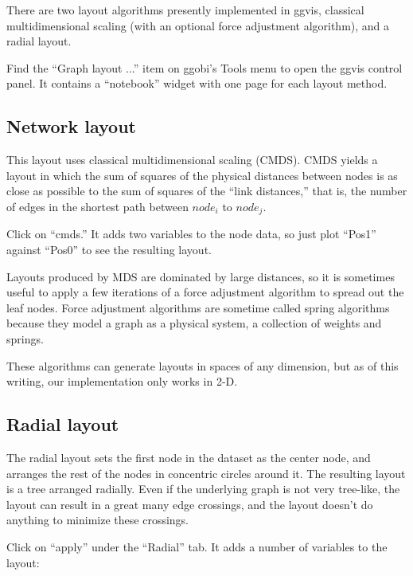 \documentclass[11pt]{article}
\begin{document}
There are two layout algorithms presently implemented in ggvis,
classical multidimensional scaling (with an optional force
adjustment algorithm), and a radial layout.

Find the ``Graph layout ...'' item on ggobi's Tools menu
to open the ggvis control panel.  It contains a ``notebook''
widget with one page for each layout method.

\subsection {Network layout}

This layout uses classical multidimensional scaling (CMDS).  CMDS yields a
layout in which the sum of squares of the physical distances between nodes
is as close as possible to the sum of squares of the ``link distances,''
that is, the number of edges in the shortest path between $node_i$
to $node_j$.

Click on ``cmds.''  It adds two variables to the node data, so 
just plot ``Pos1'' against ``Pos0'' to see the resulting layout.

Layouts produced by MDS are dominated by large distances, so it
is sometimes useful to apply a few iterations of a force adjustment
algorithm to spread out the leaf nodes.  Force adjustment algorithms
are sometime called spring algorithms because they model a graph as
a physical system, a collection of weights and springs.

These algorithms can generate layouts in spaces of any dimension,
but as of this writing, our implementation only works in 2-D.

\subsection {Radial layout}

The radial layout \cite{Wills99} sets the first node in the dataset
as the center node, and arranges the rest of the nodes in concentric
circles around it.  The resulting layout is a tree arranged radially.
Even if the underlying graph is not very tree-like, the layout can result
in a great many edge crossings, and the layout doesn't do anything to
minimize these crossings.

Click on ``apply'' under the ``Radial'' tab.  It adds a number of
variables to the layout:
\end{document}
